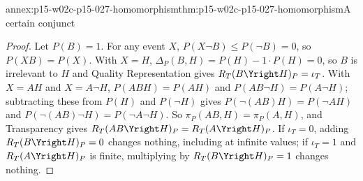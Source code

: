 \begin{annexitem}{annex:p15-w02c-p15-027-homomorphism}{thm:p15-w02c-p15-027-homomorphism}{A certain conjunct}
\begin{proof}
Let \(P(B)=1\). For any event \(X\), \(P(X\neg B)\leq P(\neg B)=0\), so
\(P(XB)=P(X)\). With \(X=H\), \(\Delta_P(B,H)=P(H)-1\cdot P(H)=0\), so
\(B\) is irrelevant to \(H\) and Quality Representation gives
\(R_T(B\Yright H)_P=\iota_T\). With \(X=AH\) and \(X=A\neg H\),
\(P(ABH)=P(AH)\) and \(P(AB\neg H)=P(A\neg H)\); subtracting these from
\(P(H)\) and \(P(\neg H)\) gives \(P(\neg(AB)H)=P(\neg AH)\) and
\(P(\neg(AB)\neg H)=P(\neg A\neg H)\). So
\(\pi_P(AB,H)=\pi_P(A,H)\), and Transparency gives
\(R_T(AB\Yright H)_P=R_T(A\Yright H)_P\). If \(\iota_T=0\), adding
\(R_T(B\Yright H)_P=0\) changes nothing, including at infinite values;
if \(\iota_T=1\) and \(R_T(A\Yright H)_P\) is finite, multiplying by
\(R_T(B\Yright H)_P=1\) changes nothing.
\end{proof}
\end{annexitem}
